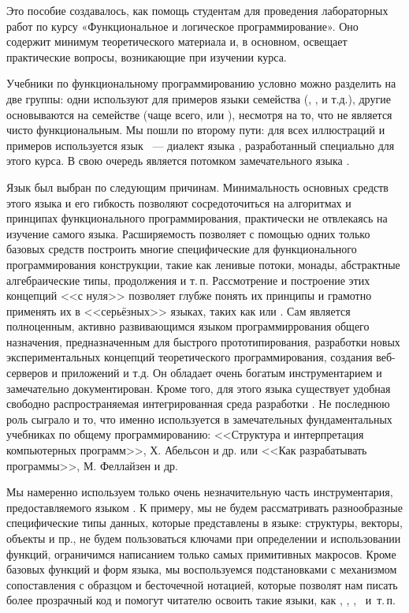 \small

Это пособие создавалось, как помощь студентам для проведения лабораторных работ по курсу «Функциональное и логическое программирование». Оно содержит минимум теоретического материала и, в основном, освещает практические вопросы, возникающие при изучении курса. 

Учебники по функциональному программированию условно можно разделить на две группы: одни используют для примеров языки семейства  (, ,  и т.д.), другие основываются на семействе  (чаще всего,  или ), несмотря на то, что  не является чисто функциональным. Мы пошли по второму пути: для всех иллюстраций и примеров используется язык \Scheme~--- диалект языка \Racket, разработанный специально для этого курса. В свою очередь \Racket является потомком замечательного языка .

Язык  был выбран по следующим причинам. Минимальность основных средств этого языка и его гибкость позволяют сосредоточиться на алгоритмах и принципах функционального программирования, практически не отвлекаясь на изучение самого языка. Расширяемость \Racket позволяет с помощью одних только базовых средств построить многие специфические для функционального программирования конструкции, такие как ленивые потоки, монады, абстрактные алгебраические типы, продолжения и т.\,п. Рассмотрение и построение этих концепций <<с нуля>> позволяет глубже понять их принципы и грамотно применять их в <<серьёзных>> языках, таких как  или .
Сам  является полноценным, активно развивающимся языком программиррования общего назначения, предназначенным для быстрого прототипирования, разработки новых экспериментальных концепций теоретического программирования, создания веб-серверов и приложений и т.д. Он обладает очень богатым инструментарием и замечательно документирован. Кроме того, для этого языка существует удобная свободно распространяемая интегрированная среда разработки . Не последнюю роль сыграло и то, что именно  используется в замечательных фундаментальных учебниках по общему программированию: <<Структура и интерпретация компьютерных программ>>, Х. Абельсон и др. или <<Как разрабатывать программы>>, М. Феллайзен и др. 

Мы намеренно используем только очень незначительную часть инструментария, предоставляемого языком \Racket. К примеру, мы не будем рассматривать разнообразные специфические типы данных, которые представлены в языке: структуры, векторы, объекты и пр., не будем пользоваться ключами при определении и использовании функций, ограничимся написанием только самых примитивных макросов. Кроме базовых функций и форм языка, мы воспользуемся подстановками с механизмом сопоставления с образцом и бесточечной нотацией, которые позволят нам писать более прозрачный код и помогут читателю освоить такие языки, как , , , ~и~т.\,п.
 
